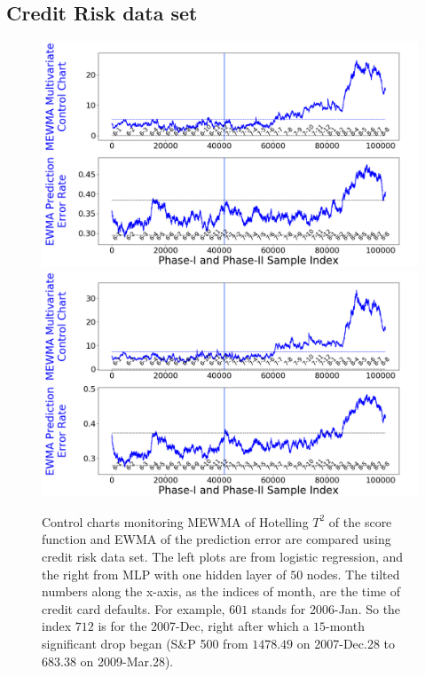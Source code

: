 \documentclass[twoside,11pt]{article}
\begin{document}
\subsection{Credit Risk data set}
\label{ss:cr_ds}
\begin{figure}[!htbp]
\centering
\includegraphics[width = 0.49\linewidth]{../figures/v14/credit_default/logi_scal_train_PI/credit_logi_1e-08_0_0001_0_001_99_0.png}
\includegraphics[width = 0.49\linewidth]{../figures/v14/credit_default/logi_nnet_scal_train_PI/credit_logi_0_002_0_0001_0_001_99_0.png}
  \caption{
Control charts monitoring MEWMA of Hotelling $T^2$ of the score function and EWMA of the prediction error are compared using credit risk data set. The left plots are from logistic regression, and the right from MLP with one hidden layer of $50$ nodes. The tilted numbers along the x-axis, as the indices of month, are the time of credit card defaults. For example, $601$ stands for 2006-Jan. So the index $712$ is for the 2007-Dec, right after which a $15$-month significant drop began (S\&P 500 from $1478.49$ on 2007-Dec.28 to $683.38$ on 2009-Mar.28).
}
\end{figure}
\end{document}
